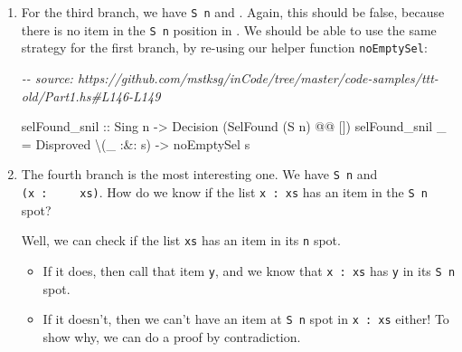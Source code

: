 \documentclass[]{article}
\newenvironment{Shaded}{}{}
\newcommand{\CommentTok}[1]{\textcolor[rgb]{0.38,0.63,0.69}{\textit{#1}}}
\newcommand{\DataTypeTok}[1]{\textcolor[rgb]{0.56,0.13,0.00}{#1}}
\newcommand{\NormalTok}[1]{#1}
\newcommand{\OperatorTok}[1]{\textcolor[rgb]{0.40,0.40,0.40}{#1}}
\newcommand{\OtherTok}[1]{\textcolor[rgb]{0.00,0.44,0.13}{#1}}
\begin{document}
\begin{enumerate}
\begin{Shaded}
\begin{Highlighting}[]
\NormalTok{selFound\_zcons}
\OtherTok{    ::} \DataTypeTok{Sing}\NormalTok{ x}
    \OtherTok{{-}\textgreater{}} \DataTypeTok{Sing}\NormalTok{ xs}
    \OtherTok{{-}\textgreater{}} \DataTypeTok{Decision}\NormalTok{ (}\DataTypeTok{SelFound} \DataTypeTok{\textquotesingle{}Z} \OperatorTok{@@}\NormalTok{ (x \textquotesingle{}}\OperatorTok{:}\NormalTok{ xs))}
\NormalTok{selFound\_zcons x \_ }\OtherTok{=} \DataTypeTok{Proved}\NormalTok{ (x }\OperatorTok{:\&:} \DataTypeTok{SelZ}\NormalTok{)}
\end{Highlighting}
\end{Shaded}
\item
  For the third branch, we have \texttt{\textquotesingle{}S\ n} and
  \texttt{\textquotesingle{}{[}{]}}. Again, this should be false, because there
  is no item in the \texttt{\textquotesingle{}S\ n} position in
  \texttt{\textquotesingle{}{[}{]}}. We should be able to use the same strategy
  for the first branch, by re-using our helper function \texttt{noEmptySel}:

\begin{Shaded}
\begin{Highlighting}[]
\CommentTok{{-}{-} source: https://github.com/mstksg/inCode/tree/master/code{-}samples/ttt{-}old/Part1.hs\#L146{-}L149}

\NormalTok{selFound\_snil}
\OtherTok{    ::} \DataTypeTok{Sing}\NormalTok{ n}
    \OtherTok{{-}\textgreater{}} \DataTypeTok{Decision}\NormalTok{ (}\DataTypeTok{SelFound}\NormalTok{ (}\DataTypeTok{\textquotesingle{}S}\NormalTok{ n) }\OperatorTok{@@}\NormalTok{ \textquotesingle{}[])}
\NormalTok{selFound\_snil \_ }\OtherTok{=} \DataTypeTok{Disproved}\NormalTok{ \textbackslash{}(\_ }\OperatorTok{:\&:}\NormalTok{ s) }\OtherTok{{-}\textgreater{}}\NormalTok{ noEmptySel s}
\end{Highlighting}
\end{Shaded}
\item
  The fourth branch is the most interesting one. We have
  \texttt{\textquotesingle{}S\ n} and
  \texttt{(x\ \textquotesingle{}:\ \ \ \ \ xs)}. How do we know if the list
  \texttt{x\ \textquotesingle{}:\ xs} has an item in the
  \texttt{\textquotesingle{}S\ n} spot?

  Well, we can check if the list \texttt{xs} has an item in its \texttt{n} spot.

  \begin{itemize}
  \item
    If it does, then call that item \texttt{y}, and we know that
    \texttt{x\ \textquotesingle{}:\ xs} has \texttt{y} in its
    \texttt{\textquotesingle{}S\ n} spot.
  \item
    If it doesn't, then we can't have an item at \texttt{\textquotesingle{}S\ n}
    spot in \texttt{x\ \textquotesingle{}:\ xs} either! To show why, we can do a
    proof by contradiction.


\end{itemize}
\end{enumerate}
\end{document}
